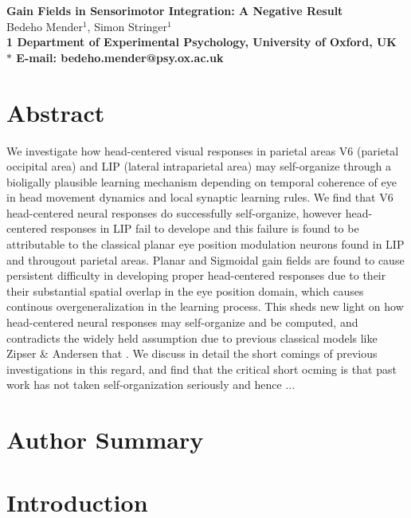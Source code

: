 \documentclass[10pt]{article}
\date{}
\begin{document}
\begin{flushleft}
{\Large
\textbf{Gain Fields in Sensorimotor Integration: A Negative Result}
}
\\
Bedeho Mender$^{1}$, 
Simon Stringer$^{1}$
\\
\bf{1} Department of Experimental Psychology, University of Oxford, UK
\\
$\ast$ E-mail: bedeho.mender@psy.ox.ac.uk
\end{flushleft}

\section*{Abstract}
We investigate how head-centered visual responses in parietal areas V6 (parietal occipital area) and LIP (lateral intraparietal area)  may self-organize through a bioligally plausible learning mechanism depending on temporal coherence of eye in head movement dynamics and local synaptic learning rules. We find that V6 head-centered neural responses do successfully self-organize, however head-centered responses in LIP fail to develope and this failure is found to be attributable to the classical planar eye position modulation neurons found in LIP and througout parietal areas. Planar and Sigmoidal gain fields are found to cause persistent difficulty in developing proper head-centered responses due to their their substantial spatial overlap in the eye position domain, which causes continous overgeneralization in the learning process. This sheds new light on how head-centered neural responses may self-organize and be computed, and contradicts the widely held assumption due to previous classical models like Zipser \& Andersen that . We discuss in detail the short comings of previous investigations in this regard, and find that the critical short ocming is that past work has not taken self-organization seriously and hence ...

\section*{Author Summary}

\section*{Introduction}
\end{document}

